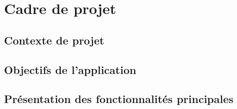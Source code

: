 \chapter{Cadre de projet} 

\section{Contexte de projet}
\section{Objectifs de l'application}
\section{Présentation des fonctionnalités principales}



